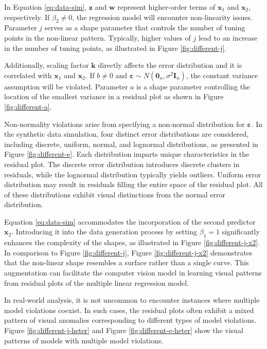 \documentclass[]{interact}
\theoremstyle{plain}%
\theoremstyle{definition}
\theoremstyle{remark}
\begin{document}
In Equation \ref{eq:data-sim}, \(\boldsymbol{z}\) and \(\boldsymbol{w}\)
represent higher-order terms of \(\boldsymbol{x}_1\) and
\(\boldsymbol{x}_2\), respectively. If \(\beta_2 \neq 0\), the
regression model will encounter non-linearity issues. Parameter \(j\)
serves as a shape parameter that controls the number of tuning points in
the non-linear pattern. Typically, higher values of \(j\) lead to an
increase in the number of tuning points, as illustrated in Figure
\ref{fig:different-j}.

Additionally, scaling factor \(\boldsymbol{k}\) directly affects the
error distribution and it is correlated with \(\boldsymbol{x}_1\) and
\(\boldsymbol{x}_2\). If \(b \neq 0\) and
\(\boldsymbol{\varepsilon} \sim N(\boldsymbol{0}_n, \sigma^2\boldsymbol{I}_n)\),
the constant variance assumption will be violated. Parameter \(a\) is a
shape parameter controlling the location of the smallest variance in a
residual plot as shown in Figure \ref{fig:different-a}.

Non-normality violations arise from specifying a non-normal distribution
for \(\boldsymbol{\varepsilon}\). In the synthetic data simulation, four
distinct error distributions are considered, including discrete,
uniform, normal, and lognormal distributions, as presented in Figure
\ref{fig:different-e}. Each distribution imparts unique characteristics
in the residual plot. The discrete error distribution introduces
discrete clusters in residuals, while the lognormal distribution
typically yields outliers. Uniform error distribution may result in
residuals filling the entire space of the residual plot. All of these
distributions exhibit visual distinctions from the normal error
distribution.

Equation \ref{eq:data-sim} accommodates the incorporation of the second
predictor \(\boldsymbol{x}_2\). Introducing it into the data generation
process by setting \(\beta_1 = 1\) significantly enhances the complexity
of the shapes, as illustrated in Figure \ref{fig:different-j-x2}. In
comparison to Figure \ref{fig:different-j}, Figure
\ref{fig:different-j-x2} demonstrates that the non-linear shape
resembles a surface rather than a single curve. This augmentation can
facilitate the computer vision model in learning visual patterns from
residual plots of the multiple linear regression model.

In real-world analysis, it is not uncommon to encounter instances where
multiple model violations coexist. In such cases, the residual plots
often exhibit a mixed pattern of visual anomalies corresponding to
different types of model violations. Figure \ref{fig:different-j-heter}
and Figure \ref{fig:different-e-heter} show the visual patterns of
models with multiple model violations.
\end{document}
